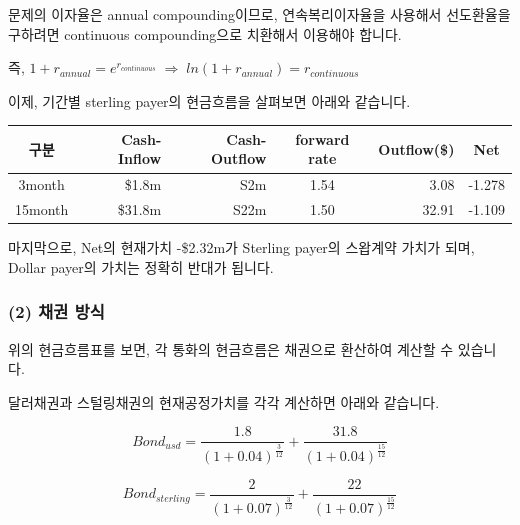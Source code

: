 \documentclass[
  letterpaper,
  DIV=11,
  numbers=noendperiod]{scrreprt}
\begin{document}
\begin{tcolorbox}[enhanced jigsaw, toprule=.15mm, breakable, left=2mm, leftrule=.75mm, opacitybacktitle=0.6, coltitle=black, rightrule=.15mm, colback=white, titlerule=0mm, bottomtitle=1mm, colframe=quarto-callout-important-color-frame, title=\textcolor{quarto-callout-important-color}{\faExclamation}\hspace{0.5em}{Interest Compounding method}, toptitle=1mm, arc=.35mm, colbacktitle=quarto-callout-important-color!10!white, opacityback=0, bottomrule=.15mm]

문제의 이자율은 annual compounding이므로, 연속복리이자율을 사용해서
선도환율을 구하려면 continuous compounding으로 치환해서 이용해야 합니다.

즉,
\(1+r_{annual}=e^{r_{continuous}}\;\Rightarrow\;ln(1+r_{annual})=r_{continuous}\)

\end{tcolorbox}

이제, 기간별 sterling payer의 현금흐름을 살펴보면 아래와 같습니다.

\begin{longtable}[]{@{}crrcrc@{}}
\toprule\noalign{}
구분 & Cash-Inflow & Cash-Outflow & forward rate & Outflow(\$) & Net \\
\midrule\noalign{}
\endhead
\bottomrule\noalign{}
\endlastfoot
3month & \$1.8m & S2m & 1.54 & 3.08 & -1.278 \\
15month & \$31.8m & S22m & 1.50 & 32.91 & -1.109 \\
\end{longtable}

마지막으로, Net의 현재가치 -\$2.32m가 Sterling payer의 스왑계약 가치가
되며, Dollar payer의 가치는 정확히 반대가 됩니다.

\subsubsection*{(2) 채권 방식}\label{uxcc44uxad8c-uxbc29uxc2dd}

위의 현금흐름표를 보면, 각 통화의 현금흐름은 채권으로 환산하여 계산할 수
있습니다.

달러채권과 스털링채권의 현재공정가치를 각각 계산하면 아래와 같습니다.

\[Bond_{usd}=\frac{1.8}{(1+0.04)^{\frac{3}{12}}}+\frac{31.8}{(1+0.04)^{\frac{15}{12}}}\]

\[Bond_{sterling}=\frac{2}{(1+0.07)^{\frac{3}{12}}}+\frac{22}{(1+0.07)^{\frac{15}{12}}}\]
\end{document}
